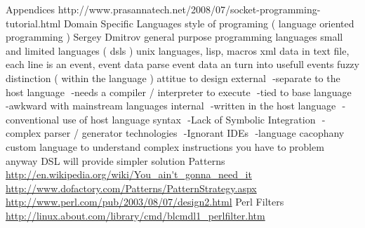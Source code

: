 Appendices
\newline
http://www.prasannatech.net/2008/07/socket-programming-tutorial.html
Domain Specific Languages
\newline
style of programing ( language oriented programming ) Sergey Dmitrov
\newline
general purpose programming languages
\newline
small and limited languages ( dsls )
\newline
unix languages, lisp, macros
\newline
xml
\newline
data in text file, each line is an event, event data
\newline
parse event data an turn into usefull events
\newline
fuzzy distinction ( within the language )
\newline
attitue to design
\newline
external
\newline
 -separate to the host language
\newline
 -needs a compiler / interpreter to execute
\newline
 -tied to base language
\newline
 -awkward with mainstream { languages }
\newline
internal
\newline
 -written in the host language
\newline
 -conventional use of host language syntax
\newline
 -Lack of Symbolic Integration
\newline
 -complex parser / generator technologies
\newline
 -Ignorant IDEs
\newline
 -language cacophany
\newline
custom language to understand complex instructions
\newline
you have to problem anyway
\newline
DSL will provide simpler solution Patterns
\newline
\url{http://en.wikipedia.org/wiki/You_ain't_gonna_need_it}
\newline
\url{http://www.dofactory.com/Patterns/PatternStrategy.aspx}
\newline
\url{http://www.perl.com/pub/2003/08/07/design2.html}
Perl Filters 
\newline
\url{http://linux.about.com/library/cmd/blcmdl1_perlfilter.htm}    
\newline

